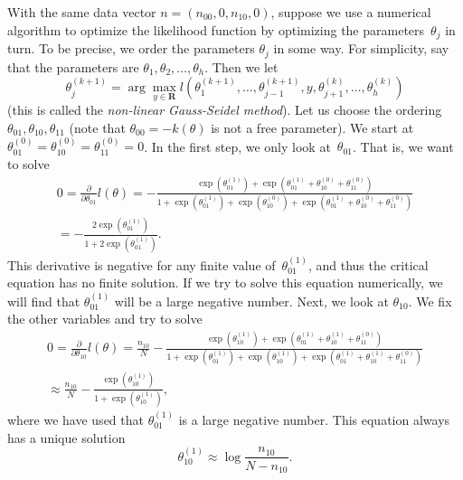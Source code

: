 \documentclass[aos,noinfoline]{imsart}
\def\R{{\mathbf R}}
\theoremstyle{remark}
\theoremstyle{definition}
\begin{document}
  With the same data vector $n=(n_{00},0,n_{10},0)$, suppose we use a numerical algorithm to optimize the likelihood
  function by optimizing the parameters~$\theta_{j}$ in turn.  To be precise, we order the parameters $\theta_{j}$ in
  some way.  For simplicity, say that the parameters are $\theta_{1},\theta_{2},\dots,\theta_{h}$.  Then we let
  \begin{equation*}
    \theta_{j}^{(k+1)} = \arg\max\limits_{y\in\R} l(\theta_{1}^{(k+1)},\dots,\theta_{j-1}^{(k+1)},y,\theta_{j+1}^{(k)},\dots,\theta_{h}^{(k)})
  \end{equation*}
  (this is called the \emph{non-linear Gauss-Seidel method}).  Let us choose the ordering
  $\theta_{01},\theta_{10},\theta_{11}$ (note that $\theta_{00}=-k(\theta)$ is not a free parameter).  We start at
  $\theta_{01}^{(0)}=\theta_{10}^{(0)}=\theta_{11}^{(0)}=0$.  In the first step, we only look at~$\theta_{01}$.  That
  is, we want to solve
  \begin{multline}
    \label{S-eq:ex:critical-eq}
    0 = \frac{\partial}{\partial\theta_{01}} l(\theta) = - \frac{\exp(\theta^{(1)}_{01}) + \exp(\theta^{(1)}_{01}+\theta^{(0)}_{10}+\theta^{(0)}_{11})}{1 + \exp(\theta^{(1)}_{01}) + \exp(\theta^{(0)}_{10}) + \exp(\theta^{(1)}_{01}+\theta^{(0)}_{10}+\theta^{(0)}_{11})}
    \\
    = - \frac{2\exp(\theta^{(1)}_{01})}{1 + 2\exp(\theta^{(1)}_{01})}.
  \end{multline}
  This derivative is negative for any finite value of~$\theta^{(1)}_{01}$, and thus the critical equation has no
  finite solution.  If we try to solve this equation numerically, we will find that $\theta^{(1)}_{01}$ will be a large
  negative number.  Next, we look at $\theta_{10}$.  We fix the other variables and try to solve
  \begin{multline*}
    0 = \frac{\partial}{\partial\theta_{10}} l(\theta) = \frac{n_{10}}{N} - \frac{\exp(\theta^{(1)}_{10}) + \exp(\theta^{(1)}_{01}+\theta^{(1)}_{10}+\theta^{(0)}_{11})}{1 + \exp(\theta^{(1)}_{01}) + \exp(\theta^{(1)}_{10}) + \exp(\theta^{(1)}_{01}+\theta^{(1)}_{10}+\theta^{(0)}_{11})}
    \\
    \approx \frac{n_{10}}{N} - \frac{\exp(\theta^{(1)}_{10})}{1 + \exp(\theta^{(1)}_{10})},
  \end{multline*}
  where we have used that $\theta^{(1)}_{01}$ is a large negative number.  This equation always has a unique
  solution
  \begin{equation*}
    \theta^{(1)}_{10}\approx \log\frac{n_{10}}{N-n_{10}}.
  \end{equation*}
\end{document}
